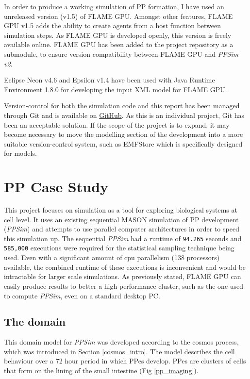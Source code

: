 \documentclass{UoYCSproject}
\begin{document}
In order to produce a working simulation of \gls{PP} formation, I have used an unreleased version (v1.5) of \gls{FLAME GPU}.
Amongst other features, \gls{FLAME GPU} v1.5 adds the ability to create agents from a host function between simulation steps.
As \gls{FLAME GPU} is developed openly, this version is freely available online\cite{flame_github}.
\gls{FLAME GPU} has been added to the project repository as a submodule, to ensure version compatibility between \gls{FLAME GPU} and \textit{PPSim v2}.

Eclipse Neon v4.6 and Epsilon v1.4 have been used with Java Runtime Environment 1.8.0 for developing the input XML model for \gls{FLAME GPU}.

Version-control for both the simulation code and this report has been managed through Git and is available on \href{https://github.com/oliver-binns/PRIY.git}{GitHub}.
As this is an individual project, Git has been an acceptable solution.
If the scope of the project is to expand, it may become necessary to move the modelling section of the development into a more suitable version-control system, such as EMFStore\cite{emf_store} which is specifically designed for models.

\section{\gls{PP} Case Study}
\label{ppsim}
This project focuses on simulation as a tool for exploring biological systems at cell level.
It uses an existing sequential \gls{MASON} simulation of \gls{PP} development\cite{kieran_thesis, kieran_methodology, kieran_results, kieran_machine_learning, spartan} (\textit{PPSim}) and attempts to use parallel computer architectures in order to speed this simulation up.
The sequential \textit{PPSim} had a runtime of \texttt{94.265} seconds and \texttt{585,000} executions were required for the statistical sampling technique being used.
Even with a significant amount of \gls{cpu} parallelism (138 processors) available, the combined runtime of these executions is inconvenient and would be intractable for larger scale simulations.\cite{kieran_machine_learning}
As previously stated, \gls{FLAME GPU} can easily produce results to better a high-performance cluster, such as the one used to compute \textit{PPSim}, even on a standard desktop PC.

\subsection{The \gls{domain}}
This domain model for \textit{PPSim} was developed according to the \acrshort{cosmos} process\cite{cosmos}, which was introduced in Section \ref{cosmos_intro}.
The model describes the cell behaviour over a 72 hour period in which \gls{PP}es develop.
\gls{PP}es are clusters of cells that form on the lining of the small intestine (Fig \ref{pp_imaging}).
\end{document}
